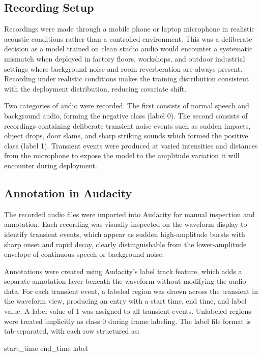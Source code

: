 \subsection{Recording Setup}

Recordings were made through a mobile phone or laptop microphone in realistic acoustic conditions rather than a controlled environment. This was a deliberate decision as a model trained on clean studio audio would encounter a systematic mismatch when deployed in factory floors, workshops, and outdoor industrial settings where background noise and room reverberation are always present. Recording under realistic conditions makes the training distribution consistent with the deployment distribution, reducing covariate shift.

Two categories of audio were recorded. The first consists of normal speech and background audio, forming the negative class (label 0). The second consists of recordings containing deliberate transient noise events such as sudden impacts, object drops, door slams, and sharp striking sounds which formed the positive class (label 1). Transient events were produced at varied intensities and distances from the microphone to expose the model to the amplitude variation it will encounter during deployment.

\subsection{Annotation in Audacity}

The recorded audio files were imported into Audacity for manual inspection and annotation. Each recording was visually inspected on the waveform display to identify transient events, which appear as sudden high-amplitude bursts with sharp onset and rapid decay, clearly distinguishable from the lower-amplitude envelope of continuous speech or background noise.

Annotations were created using Audacity's label track feature, which adds a separate annotation layer beneath the waveform without modifying the audio data. For each transient event, a labeled region was drawn across the transient in the waveform view, producing an entry with a start time, end time, and label value. A label value of 1 was assigned to all transient events. Unlabeled regions were treated implicitly as class 0 during frame labeling. The label file format is tab-separated, with each row structured as:

start\_time end\_time label

